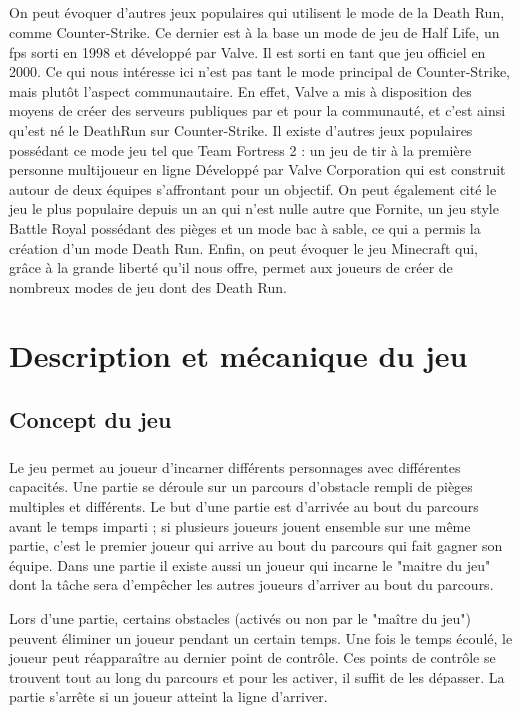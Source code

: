 \documentclass[12pt]{report}
\begin{document}
	\paragraph{}
	On peut évoquer d'autres jeux populaires qui utilisent le mode de la Death Run, comme Counter-Strike. Ce dernier est à la base un mode de jeu de Half Life, un fps sorti en 1998 et développé par Valve. Il est sorti en tant que jeu officiel en 2000. Ce qui nous intéresse ici n'est pas tant le mode principal de Counter-Strike, mais plutôt l'aspect communautaire. En effet, Valve a mis à disposition des moyens de créer des serveurs publiques par et pour la communauté, et c'est ainsi qu'est né le DeathRun sur Counter-Strike.
	Il existe d'autres jeux populaires possédant ce mode jeu tel que Team Fortress 2 : un jeu de tir à la première personne multijoueur en ligne Développé par Valve Corporation qui est construit autour de deux équipes s'affrontant pour un objectif. On peut également cité le jeu le plus populaire depuis un an qui n'est nulle autre que Fornite, un jeu style Battle Royal possédant des pièges et un mode bac à sable, ce qui a permis la création d'un mode Death Run. Enfin, on peut évoquer le jeu Minecraft qui, grâce à la grande liberté qu'il nous offre, permet aux joueurs de créer de nombreux modes de jeu dont des Death Run.

\chapter{Description et mécanique du jeu}

	\section{Concept du jeu}
	\paragraph{}
		Le jeu permet au joueur d'incarner différents personnages avec différentes capacités. Une partie se déroule sur un parcours d'obstacle rempli de pièges multiples et différents. Le but d'une partie est d'arrivée au bout du parcours avant le temps imparti ; si plusieurs joueurs jouent ensemble sur une même partie, c'est le premier joueur qui arrive au bout du parcours qui fait gagner son équipe. Dans une partie il existe aussi un joueur qui incarne le "maitre du jeu" dont la tâche sera d'empêcher les autres joueurs d'arriver au bout du parcours.
	
Lors d'une partie, certains obstacles (activés ou non par le "maître du jeu") peuvent éliminer un joueur pendant un certain temps. Une fois le temps écoulé, le joueur peut réapparaître au dernier point de contrôle. Ces points de contrôle se trouvent tout au long du parcours et pour les activer, il suffit de les dépasser. La partie s'arrête si un joueur atteint la ligne d'arriver.
\end{document}
